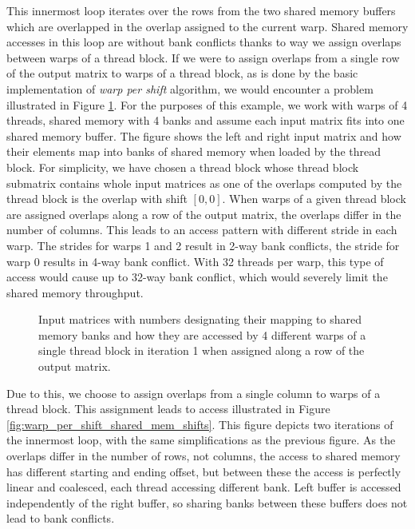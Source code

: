 
This innermost loop iterates over the rows from the two shared memory buffers which are overlapped in the overlap assigned to the current warp. Shared memory accesses in this loop are without bank conflicts thanks to way we assign overlaps between warps of a thread block. If we were to assign overlaps from a single row of the output matrix to warps of a thread block, as is done by the basic implementation of \textit{warp per shift} algorithm, we would encounter a problem illustrated in Figure \ref{fig:warp_per_shift_shared_mem_overlaps_in_x}. For the purposes of this example, we work with warps of 4 threads, shared memory with 4 banks and assume each input matrix fits into one shared memory buffer. The figure shows the left and right input matrix and how their elements map into banks of shared memory when loaded by the thread block. For simplicity, we have chosen a thread block whose thread block submatrix contains whole input matrices as one of the overlaps computed by the thread block is the overlap with shift $[0, 0]$. When warps of a given thread block are assigned overlaps along a row of the output matrix, the overlaps differ in the number of columns. This leads to an access pattern with different stride in each warp. The strides for warps 1 and 2 result in 2-way bank conflicts, the stride for warp 0 results in 4-way bank conflict. With 32 threads per warp, this type of access would cause up to 32-way bank conflict, which would severely limit the shared memory throughput.


\begin{figure}[ht]
	\centering
	\def\svgwidth{0.4\textwidth}
	\fontsize{8}{10}\selectfont
	
	\caption{Input matrices with numbers designating their mapping to shared memory banks and how they are accessed by 4 different warps of a single thread block in iteration 1 when assigned along a row of the output matrix.}
	\label{fig:warp_per_shift_shared_mem_overlaps_in_x}
\end{figure}

Due to this, we choose to assign overlaps from a single column to warps of a thread block. This assignment leads to access illustrated in Figure \ref{fig:warp_per_shift_shared_mem_shifts}. This figure depicts two iterations of the innermost loop, with the same simplifications as the previous figure.  As the overlaps differ in the number of rows, not columns, the access to shared memory has different starting and ending offset, but between these the access is perfectly linear and coalesced, each thread accessing different bank. Left buffer is accessed independently of the right buffer, so sharing banks between these buffers does not lead to bank conflicts.


